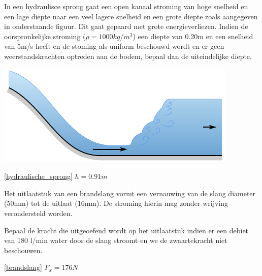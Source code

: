 \begin{toepassing}
	\label{hydraulische_sprong}
In een hydraulisce sprong gaat een open kanaal stroming van hoge snelheid en een lage diepte naar een veel lagere snelheid en een grote diepte zoals aangegeven in onderstaande figuur. Dit gaat gepaard met grote energieverliezen. Indien de oorspronkelijke stroming ($\rho=1000\unit{kg/m^3}$) een diepte van 0.20m en een snelheid van 5m/s heeft en de stoming als uniform beschouwd wordt en er geen weerstandskrachten optreden aan de bodem, bepaal dan de uiteindelijke diepte.

	\centering
	\includegraphics{fig/behoudsvergelijkingen/hydraulische_sprong}
\end{toepassing}
\begin{antwoord}{\ref{hydraulische_sprong}}
	$h = 0.91\unit{m}$
\end{antwoord}
\begin{toepassing}[*]
	\label{brandslang}
Het uitlaatstuk van een brandslang vormt een vernauwing van de slang diameter (50mm) tot de uitlaat (16mm). De stroming hierin mag zonder wrijving verondersteld worden.

Bepaal de kracht die uitgeoefend wordt op het uitlaatstuk indien er een debiet van 180 l/min water door de slang stroomt en we de zwaartekracht niet beschouwen.

	\centering
\end{toepassing}
\begin{antwoord}{\ref{brandslang}}
	$F_x = 176\unit{N}$
\end{antwoord}
